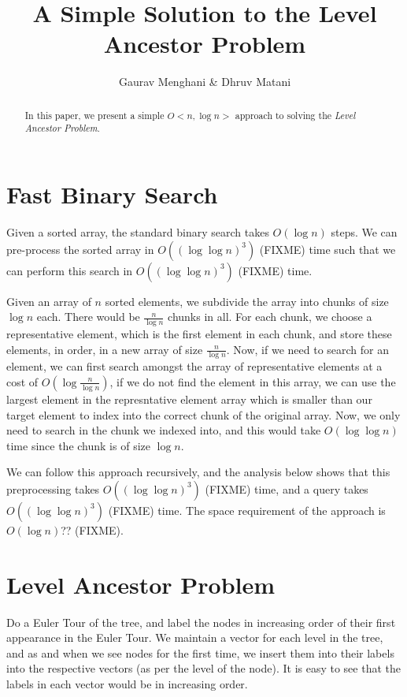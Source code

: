 \documentclass{article}
\title{A Simple Solution to the Level Ancestor Problem}
\author{Gaurav Menghani \& Dhruv Matani}
\begin{document}
\maketitle


\begin{abstract}

In this paper, we present a simple $O\mathrm{<}n, \log{n}\mathrm{>}$
approach to solving the \textit{Level Ancestor Problem}.

\end{abstract}

\section{Fast Binary Search}
Given a sorted array, the standard binary search takes $O(\log{n})$ steps. 
We can pre-process the sorted array in $O((\log{\log{n}})^3)$ (FIXME) time 
such that we can perform this search in $O((\log{\log{n}})^3)$ (FIXME) time.

Given an array of $n$ sorted elements, we subdivide the array into chunks of 
size $\log{n}$ each. There would be $ \frac{n}{ \log{n} }$ chunks in all. For each 
chunk, we choose a representative element, which is the first element in each 
chunk, and store these elements, in order, in a new array of size $\frac{n}{\log{n}}$. 
Now, if we need to search for an element, we can first search amongst the 
array of representative elements at a cost of $O(\log{\frac{n}{\log{n}}})$, 
if we do not find the element in this array, we can use the largest element 
in the represntative element array which is smaller than our target element to 
index into the correct chunk of the original array. Now, we only need to search 
in the chunk we indexed into, and this would take $O(\log{\log{n}})$ time since 
the chunk is of size $\log{n}$.

We can follow this approach recursively, and the analysis below shows that this
preprocessing takes $O((\log{\log{n}})^3)$ (FIXME) time, and a query takes
$O((\log{\log{n}})^3)$ (FIXME) time. The space requirement of the approach is 
$O(\log{n})$?? (FIXME).

\section{Level Ancestor Problem}
Do a Euler Tour of the tree, and label the nodes in increasing order of their
first appearance in the Euler Tour. We maintain a vector for each level in the 
tree, and as and when we see nodes for the first time, we insert them into their
labels into the respective vectors (as per the level of the node). It is easy
to see that the labels in each vector would be in increasing order.
\end{document}
